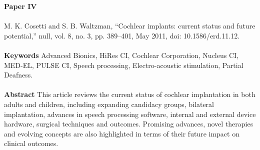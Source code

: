 
\textbf{Paper IV} 
\\ \\
\noindent
M. K. Cosetti and S. B. Waltzman, “Cochlear implants: current status and future potential,” null, vol. 8, no. 3, pp. 389–401, May 2011, doi: 10.1586/erd.11.12. \\ \\

\noindent
\textbf{Keywords} Advanced Bionics, HiRes CI, Cochlear Corporation, Nucleus CI, MED-EL, PULSE CI, Speech processing, Electro-acoustic stimulation, Partial Deafness. \\ \\

\noindent
\textbf{Abstract} This article reviews the current status of cochlear implantation in both adults and children, including expanding candidacy groups, bilateral implantation, advances in speech processing software, internal and external device hardware, surgical techniques and outcomes. Promising advances, novel therapies and evolving concepts are also highlighted in terms of their future impact on clinical outcomes. \\ \\

